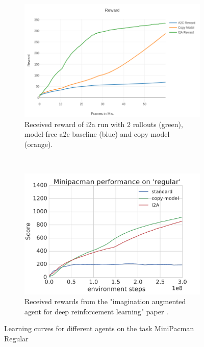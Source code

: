 \begin{figure}[H] 
    \centering
    \begin{subfigure}[b]{0.45\textwidth}
        \includegraphics[width=\textwidth]{./Images/regular_rewards_compare.png}
  		\caption{Received reward of i2a run with 2 rollouts (green), model-free a2c baseline (blue) and copy model (orange).} 
  		\label{fig:mini_pacman_regular_rewards} 
    \end{subfigure}
	~ %
    \begin{subfigure}[b]{0.45\textwidth}
        \includegraphics[width=\textwidth]{./Images/minipacman_regular.pdf}
  		\caption{Received rewards from the "imagination augmented agent for deep reinforcement learning" paper \cite{I2A}.} 
  		\label{fig:mini_pacman_regular_original_rewards}
    \end{subfigure}
    
    \caption{Learning curves for different agents on the task MiniPacman Regular}\label{fig:mini_pacman_regular}
\end{figure}

